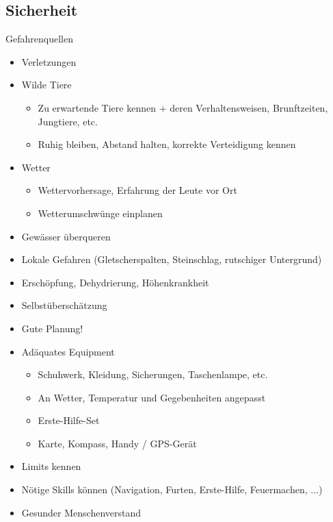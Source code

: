 \documentclass[aspectratio=169]{beamer}
\begin{document}
		\subsection{Sicherheit}
		
			\begin{frame}{Gefahrenquellen}
				\begin{itemize}
					\item Verletzungen\pause
					\item Wilde Tiere
					\begin{itemize}
						\item Zu erwartende Tiere kennen + deren Verhaltensweisen, Brunftzeiten, Jungtiere, etc.
						\item Ruhig bleiben, Abstand halten, korrekte Verteidigung kennen
					\end{itemize}\pause
					\item Wetter
					\begin{itemize}
						\item Wettervorhersage, Erfahrung der Leute vor Ort
						\item Wetterumschwünge einplanen
					\end{itemize}\pause
					\item Gewässer überqueren\pause
					\item Lokale Gefahren (Gletscherspalten, Steinschlag, rutschiger Untergrund)\pause
					\item Erschöpfung, Dehydrierung, Höhenkrankheit\pause
					\item Selbstüberschätzung
				\end{itemize}
			\end{frame}
			
			\begin{frame}{}
				\begin{itemize}
					\item Gute Planung!
					\item Adäquates Equipment
					\begin{itemize}
						\item Schuhwerk, Kleidung, Sicherungen, Taschenlampe, etc.
						\item An Wetter, Temperatur und Gegebenheiten angepasst
						\item Erste-Hilfe-Set
						\item Karte, Kompass, Handy / GPS-Gerät
					\end{itemize}
					\item Limits kennen
					\item Nötige Skills können (Navigation, Furten, Erste-Hilfe, Feuermachen, ...)\pause
					\item Gesunder Menschenverstand
				\end{itemize}
			\end{frame}
	
\end{document}
